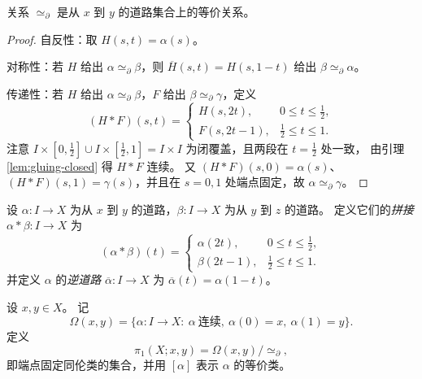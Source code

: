 \documentclass[lang=cn,a4paper,newtx,figureplace=section,tableplace=section]{elegantbook}
\begin{document}
\begin{proposition}\label{prop:path-homotopy-eqrel}
  关系 $\simeq_{\partial}$ 是从 $x$ 到 $y$ 的道路集合上的等价关系。
\end{proposition}
\begin{proof}
  自反性：取 $H(s,t)=\alpha(s)$。

  对称性：若 $H$ 给出 $\alpha\simeq_{\partial}\beta$，则 $\overline H(s,t)=H(s,1-t)$ 给出 $\beta\simeq_{\partial}\alpha$。

  传递性：若 $H$ 给出 $\alpha\simeq_{\partial}\beta$，$F$ 给出 $\beta\simeq_{\partial}\gamma$，定义
  \[
    (H\ast F)(s,t)=\begin{cases}
      H(s,2t), & 0\le t\le\tfrac12,\\
      F(s,2t-1), & \tfrac12\le t\le 1.
    \end{cases}
  \]
  注意 $I\times[0,\tfrac12]\cup I\times[\tfrac12,1]=I\times I$ 为闭覆盖，且两段在 $t=\tfrac12$ 处一致，
  由引理 \ref{lem:gluing-closed} 得 $H\ast F$ 连续。
  又 $(H\ast F)(s,0)=\alpha(s)$、$(H\ast F)(s,1)=\gamma(s)$，并且在 $s=0,1$ 处端点固定，故 $\alpha\simeq_{\partial}\gamma$。
\end{proof}

\begin{definition}[道路的拼接与逆道路]\label{def:path-concat-inverse}
  设 $\alpha:I\to X$ 为从 $x$ 到 $y$ 的道路，$\beta:I\to X$ 为从 $y$ 到 $z$ 的道路。
  定义它们的\emph{拼接} $\alpha\ast\beta:I\to X$ 为
  \[
    (\alpha\ast\beta)(t)=\begin{cases}
      \alpha(2t), & 0\le t\le\tfrac12,\\
      \beta(2t-1), & \tfrac12\le t\le 1.
    \end{cases}
  \]
  并定义 $\alpha$ 的\emph{逆道路} $\overline\alpha:I\to X$ 为 $\overline\alpha(t)=\alpha(1-t)$。
\end{definition}

\begin{definition}\label{def:pi1-xy}
  设 $x,y\in X$。
  记
  \[
    \Omega(x,y)=\{\alpha:I\to X:\ \alpha\ \text{连续},\ \alpha(0)=x,\ \alpha(1)=y\}.
  \]
  定义
  \[
    \pi_1(X;x,y)=\Omega(x,y)/\simeq_{\partial},
  \]
  即端点固定同伦类的集合，并用 $[\alpha]$ 表示 $\alpha$ 的等价类。
\end{definition}
\end{document}
